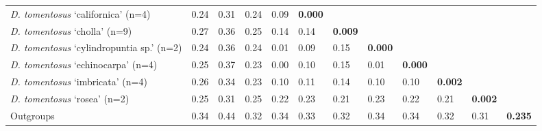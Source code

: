 \begin{landscape}
\begin{table}[]
{\begin{tabular}{@{}llllllllllll@{}}
\textit{D. tomentosus} `californica' (n=4) & 0.24 & 0.31 & 0.24 & 0.09 & \textbf{0.000} &  &  &  &  &  &  \\
\textit{D. tomentosus} `cholla' (n=9) & 0.27 & 0.36 & 0.25 & 0.14 & 0.14 & \textbf{0.009} &  &  &  &  &  \\
\textit{D. tomentosus} `cylindropuntia sp.' (n=2) & 0.24 & 0.36 & 0.24 & 0.01 & 0.09 & 0.15 & \textbf{0.000} &  &  &  &  \\
\textit{D. tomentosus} `echinocarpa' (n=4) & 0.25 & 0.37 & 0.23 & 0.00 & 0.10 & 0.15 & 0.01 & \textbf{0.000} &  &  &  \\
\textit{D. tomentosus} `imbricata' (n=4) & 0.26 & 0.34 & 0.23 & 0.10 & 0.11 & 0.14 & 0.10 & 0.10 & \textbf{0.002} &  &  \\
\textit{D. tomentosus} `rosea' (n=2) & 0.25 & 0.31 & 0.25 & 0.22 & 0.23 & 0.21 & 0.23 & 0.22 & 0.21 & \textbf{0.002} &  \\
Outgroups & 0.34 & 0.44 & 0.32 & 0.34 & 0.33 & 0.32 & 0.34 & 0.34 & 0.32 & 0.31 & \textbf{0.235} \\ \bottomrule
\end{tabular}
}
\end{table}



\end{landscape}
